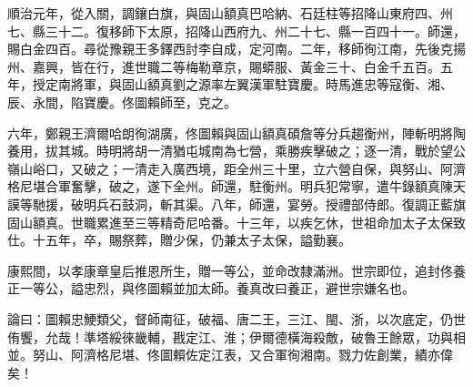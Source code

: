 \begin{pinyinscope}
順治元年，從入關，調鑲白旗，與固山額真巴哈納、石廷柱等招降山東府四、州七、縣三十二。復移師下太原，招降山西府九、州二十七、縣一百四十一。師還，賜白金四百。尋從豫親王多鐸西討李自成，定河南。二年，移師徇江南，先後克揚州、嘉興，皆在行，進世職二等梅勒章京，賜蟒服、黃金三十、白金千五百。五年，授定南將軍，與固山額真劉之源率左翼漢軍駐寶慶。時馬進忠等寇衡、湘、辰、永間，陷寶慶。佟圖賴師至，克之。

六年，鄭親王濟爾哈朗徇湖廣，佟圖賴與固山額真碩詹等分兵趨衡州，陣斬明將陶養用，拔其城。時明將胡一清猶屯城南為七營，乘勝疾擊破之；逐一清，戰於望公嶺山峪口，又破之；一清走入廣西境，距全州三十里，立六營自保，與努山、阿濟格尼堪合軍奮擊，破之，遂下全州。師還，駐衡州。明兵犯常寧，遣牛錄額真陳天謨等馳援，破明兵石鼓洞，斬其渠。八年，師還，宴勞。授禮部侍郎。復調正藍旗固山額真。世職累進至三等精奇尼哈番。十三年，以疾乞休，世祖命加太子太保致仕。十五年，卒，賜祭葬，贈少保，仍兼太子太保，謚勤襄。

康熙間，以孝康章皇后推恩所生，贈一等公，並命改隸滿洲。世宗即位，追封佟養正一等公，謚忠烈，與佟圖賴並加太師。養真改曰養正，避世宗嫌名也。

論曰：圖賴忠鯁類父，督師南征，破福、唐二王，三江、閩、浙，以次底定，仍世侑饗，允哉！準塔綏徠畿輔，戡定江、淮；伊爾德橫海殺敵，破魯王餘眾，功與相並。努山、阿濟格尼堪、佟圖賴佐定江表，又合軍徇湘南。戮力佐創業，績亦偉矣！


\end{pinyinscope}